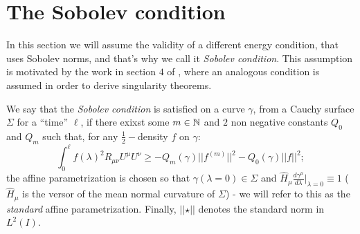 \section{The Sobolev condition}
In this section we will assume the validity of a different energy condition, that uses Sobolev norms, and that's why we call it \emph{Sobolev condition}.
This assumption is motivated by the work in section \(4\) of \cite{fewster2020new}, where an analogous condition is assumed in order to derive singularity theorems.

\begin{definition}
	We say that the \emph{Sobolev condition} is satisfied on a curve \(\gamma\), from a Cauchy surface \(\Sigma\) for a ``time'' \(\ell\), if there exixst some \(m\in {\mathbb{N}}\) and \(2\) non negative constants \(Q_0\) and \(Q_m\) such that, for any \(\frac{1}{2}-\)density \(f\) on \(\gamma\):
    \begin{equation}
        \label{eq:Sobolev-condition}
        \int_0^{\ell} f(\lambda)^2 R_{\mu\nu}U^{\mu}U^{\nu} \ge -Q_m(\gamma) \vert\vert f^{(m)}\vert\vert^2 - Q_0(\gamma) \vert\vert f\vert\vert^2;
    \end{equation}
	the affine parametrization is chosen so that \(\gamma(\lambda = 0) \in \Sigma\) and \(\hat{H}_{\mu}\frac{d\gamma^{\mu}}{d\lambda}\Big\vert_{\lambda = 0} \equiv 1\) (\(\hat{H}_{\mu}\) is the versor of the mean normal curvature of \(\Sigma\)) - we will refer to this as the \emph{standard} affine parametrization. Finally, \(\vert\vert \star \vert\vert\) denotes the standard norm in \(L^2(I)\).
\end{definition}

